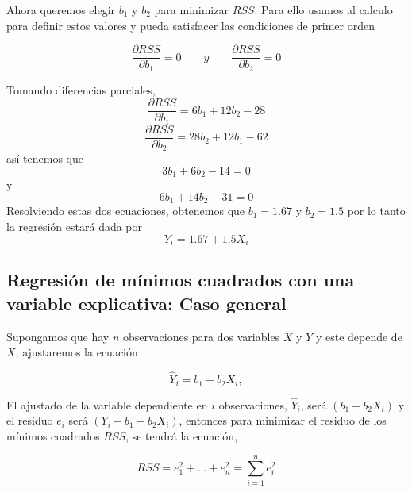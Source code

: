 \begin{multicols}{2}
Ahora queremos elegir $b_1$ y $b_2$ para minimizar $RSS$. Para ello usamos al calculo para definir estos valores y pueda satisfacer las condiciones de primer orden
\begin{tcolorbox}[colframe = white]
\begin{equation}
    \dfrac{\partial RSS}{\partial b_1} = 0 \qquad y \qquad \dfrac{\partial RSS}{\partial b_2} = 0
\end{equation}
\end{tcolorbox}
Tomando diferencias parciales,
\begin{equation}
    \dfrac{\partial RSS}{\partial b_1} = 6b_1 + 12b_2 -28 
\end{equation}
\vspace{.5cm}
\begin{equation}
    \dfrac{\partial RSS}{\partial b_2} = 28b_2 + 12b_1 - 62 
\end{equation}
así tenemos que
\begin{equation}
    3b_1 + 6b_2 - 14 = 0
\end{equation}
y
\begin{equation}
    6b_1 +14b_2 - 31 = 0
\end{equation}
Resolviendo estas dos ecuaciones, obtenemos que $b_1=1.67$ y $b_2=1.5$ por lo tanto la regresión estará dada por
\begin{equation}
    Y_i = 1.67 + 1.5 X_i
\end{equation}
\vspace{.5cm}

\subsection{Regresión de mínimos cuadrados con una variable explicativa: Caso general}
Supongamos que hay $n$ observaciones para dos variables $X$ y $Y$ y este depende de $X$, ajustaremos la ecuación
\begin{tcolorbox}[colframe = white]
    \begin{equation}
	\hat{Y}_i = b_1 + b_2 X_i,
    \end{equation}
\end{tcolorbox}
El ajustado de la variable dependiente en $i$ observaciones, $\hat{Y}_i$, será $(b_1+b_2X_i)$ y el residuo $e_i$ será $(Y_i -b_1 - b_2X_i)$, entonces para minimizar el residuo de los mínimos cuadrados $RSS$, se tendrá la ecuación,
\begin{tcolorbox}[colframe = white]
    \begin{equation}
	RSS = e_1^2 + \ldots + e_n^2 = \sum_{i=1}^{n} e_i^2
    \end{equation}
\end{tcolorbox}


\end{multicols}
